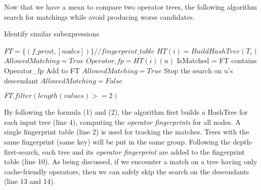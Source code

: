 Now that we have a mean to compare two operator trees, the following algorithm search for matchings while avoid producing worse candidates.


\begin{algorithm}
\caption{Identify similar subexpressions}\label{sec:common_sub_alg}
\begin{algorithmic}[1]
\State $FT = \{(f\_print, [nodes])\} //fingerprint\_table$ 
	\State$HT(i) = BuildHashTree(T_{i})$
	\State $AllowedMatching = True$	
		\State $Operator\_fp = HT(i)(u)$
		\State IsMatched = FT contains Operator\_fp
				\State Add to FT
		\EndIf
		\State $AllowedMatching = True$	
			\State Stop the search on u's descendant
			\State $AllowedMatching = False$	
		\EndIf		
	\EndFor
	
\EndFor

\State \Return $FT.filter(length(values) >= 2)$
\EndProcedure
\end{algorithmic}
\end{algorithm}

By following the formula (1) and (2), the algorithm first builds a HashTree for each input tree (line 4), computing the \emph{operator fingerprints} for all nodes. A single fingerprint table (line 2) is used for tracking the matches. Trees with the same fingerprint (same key) will be put in the same group. Following the depth-first-search, each tree and its \emph{operator fingerprint} are added to the fingerprint table (line 10). As being discussed, if we encounter a match on a tree having only cache-friendly operators, then we can safely skip the search on the descendants (line 13 and 14).